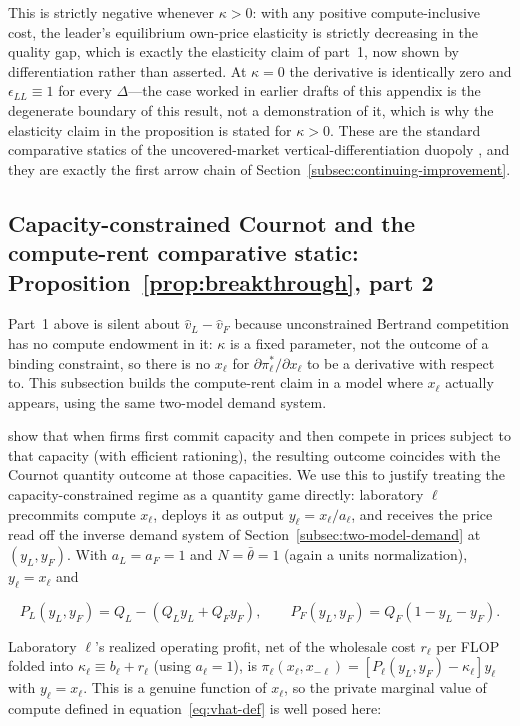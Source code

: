 \documentclass[11pt]{article}
\begin{document}
This is strictly negative whenever $\kappa>0$: with any positive compute-inclusive cost, the leader's equilibrium own-price elasticity is strictly decreasing in the quality gap, which is exactly the elasticity claim of part~1, now shown by differentiation rather than asserted. At $\kappa=0$ the derivative is identically zero and $\epsilon_{LL}\equiv1$ for every $\Delta$---the case worked in earlier drafts of this appendix is the degenerate boundary of this result, not a demonstration of it, which is why the elasticity claim in the proposition is stated for $\kappa>0$. These are the standard comparative statics of the uncovered-market vertical-differentiation duopoly \citep{shakedSutton1982,singhVives1984}, and they are exactly the first arrow chain of Section~\ref{subsec:continuing-improvement}.

\subsection{Capacity-constrained Cournot and the compute-rent comparative static: Proposition~\ref{prop:breakthrough}, part 2}
\label{subsec:app-cournot-breakthrough}

Part~1 above is silent about $\widehat v_L-\widehat v_F$ because unconstrained Bertrand competition has no compute endowment in it: $\kappa$ is a fixed parameter, not the outcome of a binding constraint, so there is no $x_\ell$ for $\partial\pi^*_\ell/\partial x_\ell$ to be a derivative with respect to. This subsection builds the compute-rent claim in a model where $x_\ell$ actually appears, using the same two-model demand system.

\citet{krepsScheinkman1983} show that when firms first commit capacity and then compete in prices subject to that capacity (with efficient rationing), the resulting outcome coincides with the Cournot quantity outcome at those capacities. We use this to justify treating the capacity-constrained regime as a quantity game directly: laboratory $\ell$ precommits compute $x_\ell$, deploys it as output $y_\ell=x_\ell/a_\ell$, and receives the price read off the inverse demand system of Section~\ref{subsec:two-model-demand} at $(y_L,y_F)$. With $a_L=a_F=1$ and $N=\bar\theta=1$ (again a units normalization), $y_\ell=x_\ell$ and

\begin{equation}P_L(y_L,y_F)=Q_L-(Q_L y_L+Q_F y_F),\qquad P_F(y_L,y_F)=Q_F(1-y_L-y_F).\end{equation}

Laboratory $\ell$'s realized operating profit, net of the wholesale cost $r_\ell$ per FLOP folded into $\kappa_\ell\equiv b_\ell+r_\ell$ (using $a_\ell=1$), is $\pi_\ell(x_\ell,x_{-\ell})=\left[P_\ell(y_L,y_F)-\kappa_\ell\right]y_\ell$ with $y_\ell=x_\ell$. This is a genuine function of $x_\ell$, so the private marginal value of compute defined in equation~\eqref{eq:vhat-def} is well posed here:
\end{document}
